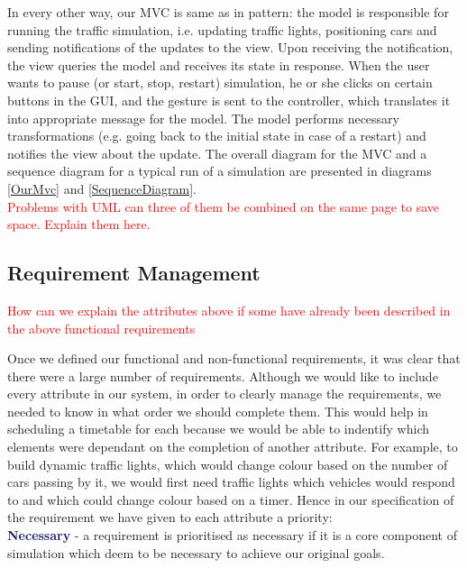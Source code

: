 \documentclass{article}
\begin{document}
   In every other way, our MVC is same as in pattern: the model is responsible for running the traffic simulation, i.e. updating traffic lights, positioning cars and sending notifications of the updates to the view. Upon receiving the notification, the view queries the model and receives its state in response. 
   When the user wants to pause (or start, stop, restart) simulation, he or she clicks on certain buttons in the GUI, and the gesture is sent to the controller, which translates it into appropriate message for the model. 
   The model performs necessary transformations (e.g. going back to the initial state in case of a restart) and notifies the view about the update. 
   The overall diagram for the MVC and a sequence diagram for a typical run of a simulation are presented in diagrams \ref{OurMvc} and \ref{SequenceDiagram}. \\
   
\textcolor{red}{Problems with UML can three of them be combined on the same page to save space. Explain them here.}

\subsection{Requirement Management}\label{Requirement Management}
\textcolor{red}{How can we explain the attributes above if some have already been described in the above functional requirements\\
}

Once we defined our functional and non-functional requirements, it was clear that there were a large number of requirements. 
Although we would like to include every attribute in our system, in order to clearly manage the requirements, we needed to know in what order we should complete them. 
This would help in scheduling a timetable for each because we would be able to indentify which elements were dependant on the completion of another attribute. 
For example, to build dynamic traffic lights, which would change colour based on the number of cars passing by it, we would first need traffic lights which vehicles would respond to and which could change colour based on a timer. 
Hence in our specification of the requirement we have given to each attribute a priority:\\

\noindent
\textcolor{MidnightBlue}{\bf Necessary}
- a requirement is prioritised as necessary if it is a core component of simulation which deem to be necessary to achieve our original goals.\\
\end{document}
